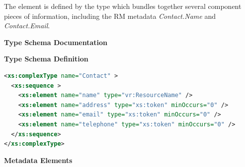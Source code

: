 \documentclass[11pt,a4paper]{ivoa}
\begin{document}
The  element is defined by the
 type which bundles together several component
pieces of information, including the RM metadata \emph{Contact.Name}
and \emph{Contact.Email}.  



\begingroup
      	\renewcommand*\descriptionlabel[1]{%
      	\hbox to 5.5em{\emph{#1}\hfil}}\vspace{2ex}\noindent\textbf{ Type Schema Documentation}


\vspace{1ex}\noindent\textbf{ Type Schema Definition}

\begin{lstlisting}[language=XML,basicstyle=\footnotesize]
<xs:complexType name="Contact" >
  <xs:sequence >
    <xs:element name="name" type="vr:ResourceName" />
    <xs:element name="address" type="xs:token" minOccurs="0" />
    <xs:element name="email" type="xs:token" minOccurs="0" />
    <xs:element name="telephone" type="xs:token" minOccurs="0" />
  </xs:sequence>
</xs:complexType>
\end{lstlisting}

\vspace{0.5ex}\noindent\textbf{ Metadata Elements}
\end{document}

